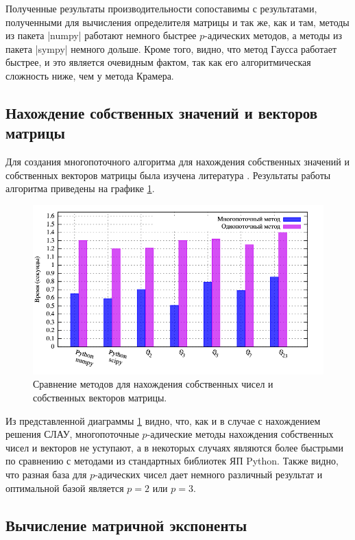 \documentclass[master, och, times, nir]{sty/SCWorks}
\begin{document}
Полученные результаты производительности сопоставимы с результатами, полученными для вычисления определителя матрицы и так же, как и там, методы из пакета |numpy| работают немного быстрее $p$-адических методов, а методы из пакета |sympy| немного дольше. Кроме того, видно, что метод Гаусса работает быстрее, и это является очевидным фактом, так как его алгоритмическая сложность ниже, чем у метода Крамера.

\subsection{Нахождение собственных значений и векторов матрицы}

Для создания многопоточного алгоритма для нахождения собственных значений и собственных векторов матрицы была изучена литература \cite{bib:number:theory, bib:algebra:1, bib:number:borevich}. Результаты работы алгоритма приведены на графике \ref{img:multi:jacoby}.

\begin{figure}[H]
\centerline{\includegraphics[width=0.85\linewidth]{../gnuplot/multi/jacoby/plot.png}}
\caption{Сравнение методов для нахождения собственных чисел и собственных векторов матрицы.}
\label{img:multi:jacoby}
\end{figure}

Из представленной диаграммы \ref{img:multi:jacoby} видно, что, как и в случае с нахождением решения СЛАУ, многопоточные $p$-адические методы нахождения собственных чисел и векторов не уступают, а в некоторых случаях являются более быстрыми по сравнению с методами из стандартных библиотек ЯП Python. Также видно, что разная база для $p$-адических чисел дает немного различный результат и оптимальной базой является $p=2$ или $p=3$.

\subsection{Вычисление матричной экспоненты}
\end{document}
